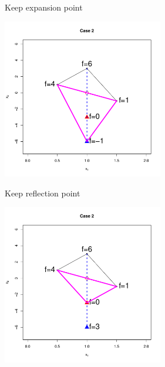 \documentclass[10pt]{beamer}
\begin{document}
                                                                                              \begin{frame}{Keep expansion point}
                                                                                                \begin{center}
                                                                                                  \includegraphics[height=7cm]{RCode/nmexpansion3.pdf}
                                                                                                \end{center}
                                                                                              \end{frame}
                                                                                              \begin{frame}{Keep reflection point}
                                                                                                \begin{center}
                                                                                                  \includegraphics[height=7cm]{RCode/nmexpansion4.pdf}
                                                                                                \end{center}
                                                                                              \end{frame}
\end{document}
